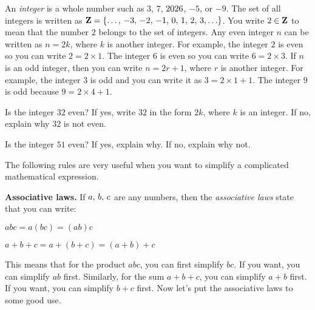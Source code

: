\documentclass[a4paper,oneside,12pt]{article}
\begin{document}
An \emph{integer} is a whole number such as $3$, $7$, $\the\year$,
$-5$, or $-9$.  The set of all integers is written as
$\ZZ = \set{\dots,\, -3,\, -2,\, -1,\, 0,\, 1,\, 2,\, 3,\dots}$.  You
write $2 \in \mathbf{Z}$ to mean that the number $2$ belongs to the set of
integers.  Any even integer $n$ can be written as $n = 2k$, where $k$
is another integer.  For example, the integer $2$ is even so you can
write $2 = 2 \times 1$.  The integer $6$ is even so you can write
$6 = 2 \times 3$.  If $n$ is an odd integer, then you can write
$n = 2r + 1$, where $r$ is another integer.  For example, the integer
$3$ is odd and you can write it as $3 = 2 \times 1 + 1$.  The integer
$9$ is odd because $9 = 2 \times 4 + 1$.

\begin{exercise}
Is the integer $32$ even?  If yes, write $32$ in the form $2k$, where
$k$ is an integer.  If no, explain why $32$ is not even.
\end{exercise}


\begin{exercise}
Is the integer $51$ even?  If yes, explain why.  If no, explain why
not.
\end{exercise}


The following rules are very useful when you want to simplify a
complicated mathematical expression.

\begin{definition}
\textbf{Associative laws.}
If ${a},\, {b},\, {c}$ are any numbers, then the
\emph{associative laws} state that you can write:
\begin{packedenumeral}
\item $abc = a (bc) = (ab) c$

\item $a + b + c = a + (b + c) = (a + b) + c$
\end{packedenumeral}
\end{definition}

This means that for the product $abc$, you can first simplify $bc$.
If you want, you can simplify $ab$ first.  Similarly, for the sum
$a + b + c$, you can simplify $a + b$ first.  If you want, you can
simplify $b + c$ first.  Now let's put the associative laws to some
good use.
\end{document}
